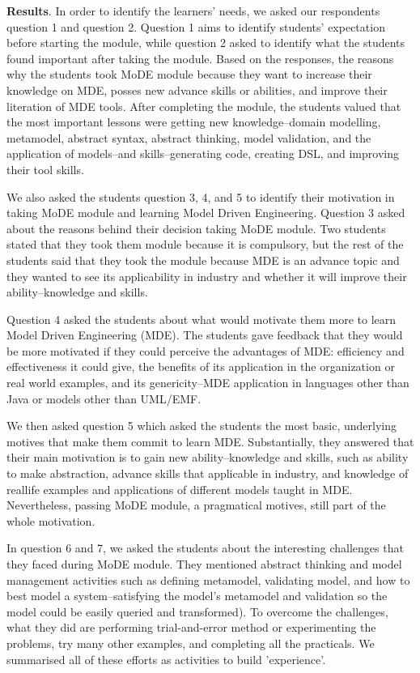 \documentclass[12pt, a4paper]{report}
\begin{document}
\textbf{Results}. In order to identify the learners' needs, we asked our respondents question 1 and question 2. Question 1 aims to identify students' expectation before starting the module, while question 2 asked to identify what the students found important after taking the module. Based on the responses, the reasons why the students took MoDE module because they want to increase their knowledge on MDE, posses new advance skills or abilities, and improve their literation of MDE tools. After completing the module, the students valued that the most important lessons were getting new knowledge--domain modelling, metamodel, abstract syntax, abstract thinking, model validation, and the application of models--and skills--generating code, creating DSL, and improving their tool skills.   

We also asked the students question 3, 4, and 5 to identify their motivation in taking MoDE module and learning Model Driven Engineering.  Question 3 asked about the reasons behind their decision taking MoDE module. Two students stated that they took them module because it is compulsory, but the rest of the students said that they took the module because MDE is an advance topic and they wanted to see its applicability in industry and whether it will improve their ability--knowledge and skills. 

Question 4 asked the students about what would motivate them more to learn Model Driven Engineering (MDE). The students gave feedback that they would be more motivated if they could perceive the advantages of MDE: efficiency and effectiveness it could give, the benefits of its application in the organization or real world examples, and its genericity--MDE application in languages other than Java or models other than UML/EMF.

We then asked question 5 which asked the students the most basic, underlying motives that make them commit to learn MDE. Substantially, they answered that their main motivation is to gain new ability--knowledge and skills, such as ability to make abstraction, advance skills that applicable in industry, and knowledge of reallife examples and applications of different models taught in MDE. Nevertheless, passing MoDE module, a pragmatical motives, still part of the whole motivation.  

In question 6 and 7, we asked the students about the interesting challenges that they faced during MoDE module. They mentioned abstract thinking and model management activities such as defining metamodel, validating model, and how to best model a system--satisfying the model's metamodel and validation so the model could be easily queried and transformed). To overcome the challenges, what they did are performing trial-and-error method or experimenting the problems, try many other examples, and completing all the practicals. We summarised all of these efforts as activities to build 'experience'.
\end{document}
